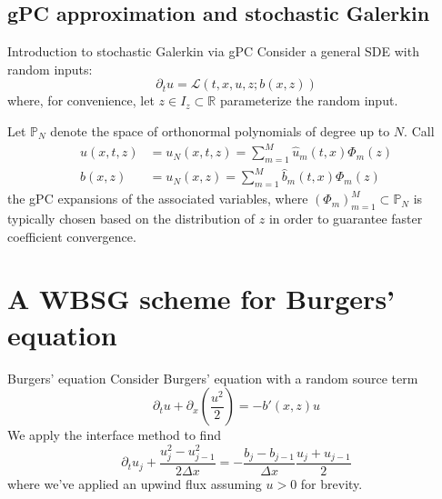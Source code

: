 \documentclass[
    pdf,
    11pt,
    xcolor={svgnames},
  ]{beamer}
\begin{document}
\subsection{gPC approximation and stochastic Galerkin}
\begin{frame}{Introduction to stochastic Galerkin via gPC}
    Consider a general SDE with random inputs:
    \begin{equation} \label{eq:SDE}
        \partial_t u = \mathcal{L}(t,x,u,z;b(x,z))
    \end{equation}
    where, for convenience, let $z \in I_z \subset \mathbb{R}$ parameterize the random input.
    
    \pause
    
    Let $\mathbb{P}_N$ denote the space of orthonormal polynomials of degree up to $N$. Call
    \begin{align*}
        u(x,t,z) &= u_N(x,t,z) = \sum_{m=1}^M \hat{u}_m(t,x) \Phi_m(z) \\
        b(x,z) &= u_N(x,z) = \sum_{m=1}^M \hat{b}_m(t,x) \Phi_m(z) 
    \end{align*}
    the gPC expansions of the associated variables, where $(\Phi_m)_{m=1}^M \subset \mathbb{P}_N$ is typically chosen based on the distribution of $z$ in order to guarantee faster coefficient convergence.
\end{frame}


\section{A WBSG scheme for Burgers' equation}

\begin{frame}{Burgers' equation}
    Consider Burgers' equation with a random source term
    \begin{equation}
        \partial_t u + \partial_x \left( \frac{u^2}{2} \right) = -b'(x,z) u
    \end{equation}
    \pause
    We apply the interface method to find
    \begin{equation} \label{eq:burgers_inteface}
        \partial_t u_j + \frac{u_j^2 - u_{j-1}^2}{2 \Delta x} = -\frac{b_j - b_{j-1}}{\Delta x} \frac{u_j + u_{j-1}}{2}
    \end{equation}
    where we've applied an upwind flux assuming $u > 0$ for brevity.
\end{frame}
\end{document}
